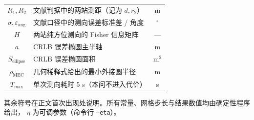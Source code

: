 \begin{table}[H]
\begin{tabular}{clc}
    $R_1,R_2$                 & 文献判据中的两站测距（记为 $d,r_2$） & m \\
    $\sigma,\varepsilon_{\mathrm{ang}}$ & 文献口径中的测向误差标准差 / 角度 & $^\circ$ \\
    $H$                       & 两站纯方位测向的 Fisher 信息矩阵 & --- \\
    $a$                       & CRLB 误差椭圆主半轴 & m \\
    $S_{\mathrm{ellipse}}$    & CRLB 误差椭圆面积 & m$^2$ \\
    $\rho_{\mathrm{MEC}}$     & 几何稀释式给出的最小外接圆半径 & m \\
    $T_{\max}$                & 单次测向耗时 $5$ s（本问不进入代价） & s \\
    \bottomrule
  \end{tabular}
\end{table}

其余符号在正文首次出现处说明。所有常量、网格步长与结果数值均由确定性程序给出，
$\eta$ 为可调参数（命令行 \texttt{--eta}）。
